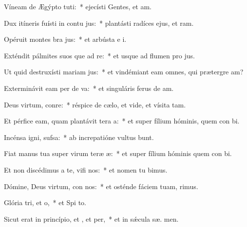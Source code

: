 \item Víneam de Ægýpto tuti:~* ejecísti Gentes, et  am.
\item Dux itíneris fuísti in contu jus:~* plantásti radíces ejus, et  ram.
\item Opéruit montes bra jus:~* et arbústa e  i.
\item Exténdit pálmites suos que ad re:~* et usque ad flumen pro jus.
\item Ut quid destruxísti mariam jus:~* et vindémiant eam omnes, qui prætergre am?
\item Exterminávit eam per de va:~* et singuláris ferus de  am.
\item Deus virtum, conre:~* réspice de cælo, et vide, et vísita  tam.
\item Et pérfice eam, quam plantávit tera a:~* et super fílium hóminis, quem con bi.
\item Incénsa igni,  sufsa:~* ab increpatióne vultus  bunt.
\item Fiat manus tua super virum teræ æ:~* et super fílium hóminis quem con bi.
\item Et non discédimus a te, vifi nos:~* et nomen tu bimus.
\item Dómine, Deus virtum, con nos:~* et osténde fáciem tuam,   rimus.
\item Glória tri, et o,~* et Spi to.
\item Sicut erat in princípio, et , et per,~* et in sǽcula sæ. men.
